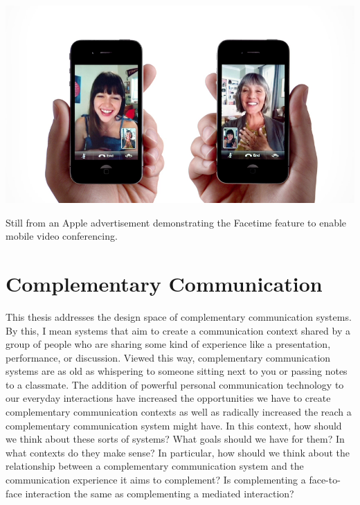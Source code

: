 



\begin{marginfigure}
	\includegraphics{figures/iphone-face-to-face.png}
	\caption{Still from an Apple advertisement demonstrating the Facetime feature to enable mobile video conferencing.}
	\label{fig:facetime}
\end{marginfigure}




\section{Complementary Communication}
This thesis addresses the design space of complementary communication systems. By this, I mean systems that aim to create a communication context shared by a group of people who are sharing some kind of experience like a presentation, performance, or discussion. Viewed this way, complementary communication systems are as old as whispering to someone sitting next to you or passing notes to a classmate. The addition of powerful personal communication technology to our everyday interactions have increased the opportunities we have to create complementary communication contexts as well as radically increased the reach a complementary communication system might have. In this context, how should we think about these sorts of systems? What goals should we have for them? In what contexts do they make sense? In particular, how should we think about the relationship between a complementary communication system and the communication experience it aims to complement? Is complementing a face-to-face interaction the same as complementing a mediated interaction?

